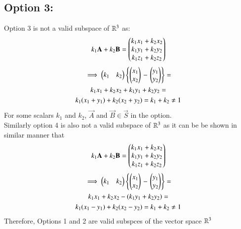 \documentclass[journal,12pt,twocolumn]{IEEEtran}
\begin{document}
\subsection{Option 3:}
Option 3 is not a valid subspace of $\mathbb{R}^3$ as:
\begin{align}
  k_1\mathbf{A} + k_2\mathbf{B} = \begin{pmatrix}k_1x_1 + k_2x_2 \\ k_1y_1 + k_2y_2 \\ k_1z_1 + k_2z_2\end{pmatrix}
\end{align}
\begin{multline}
  \implies \begin{pmatrix}k_1 & k_2\end{pmatrix}\left\{\begin{pmatrix}x_1 \\ x_2\end{pmatrix}\right. - \left.\begin{pmatrix}y_1 \\ y_2\end{pmatrix}\right\} = \\
  k_1x_1+k_2x_2+k_1y_1+k_2y_2 = \\
  k_1(x_1+y_1)+k_2(x_2+ y_2) = k_1 + k_2 \neq 1
\end{multline}
For some scalars $k_1$ and $k_2$, $\vec{A}$ and $\vec{B} \in \vec{S}$ in the option. \\
Similarly option 4 is also not a valid subspace of $\mathbb{R}^3$ as it can be be shown in similar manner that
\begin{align}
  k_1\mathbf{A} + k_2\mathbf{B} = \begin{pmatrix}k_1x_1 + k_2x_2 \\ k_1y_1 + k_2y_2 \\ k_1z_1 + k_2z_2\end{pmatrix}
\end{align}
\begin{multline}
  \implies \begin{pmatrix}k_1 & k_2\end{pmatrix}\left\{\begin{pmatrix}x_1 \\ x_2\end{pmatrix}\right. - \left.\begin{pmatrix}y_1 \\ y_2\end{pmatrix}\right\} = \\
  k_1x_1+k_2x_2-(k_1y_1+k_2y_2) = \\
  k_1(x_1-y_1)+k_2(x_2-y_2) = k_1 + k_2 \neq 1
\end{multline}
Therefore, Options 1 and 2 are valid subspces of the vector space $\mathbb{R}^3$
\end{document}
